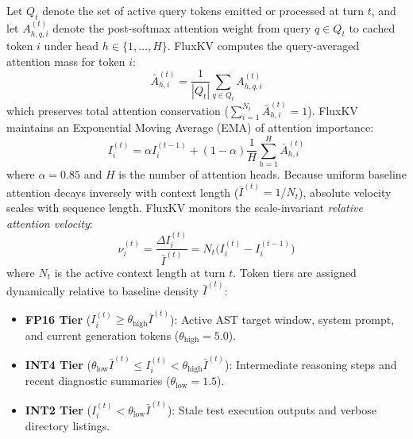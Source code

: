 \documentclass[10pt,twocolumn]{article}
\begin{document}
Let $Q_t$ denote the set of active query tokens emitted or processed at turn $t$, and let $A_{h,q,i}^{(t)}$ denote the post-softmax attention weight from query $q \in Q_t$ to cached token $i$ under head $h \in \{1, \dots, H\}$. FluxKV computes the query-averaged attention mass for token $i$:
\begin{equation}
    \bar{A}_{h,i}^{(t)} = \frac{1}{|Q_t|} \sum_{q \in Q_t} A_{h,q,i}^{(t)}
\end{equation}
which preserves total attention conservation ($\sum_{i=1}^{N_t} \bar{A}_{h,i}^{(t)} = 1$). FluxKV maintains an Exponential Moving Average (EMA) of attention importance:
\begin{equation}
    I_i^{(t)} = \alpha I_i^{(t-1)} + (1 - \alpha) \frac{1}{H} \sum_{h=1}^H \bar{A}_{h,i}^{(t)}
\end{equation}
where $\alpha = 0.85$ and $H$ is the number of attention heads. Because uniform baseline attention decays inversely with context length ($\bar{I}^{(t)} = 1/N_t$), absolute velocity scales with sequence length. FluxKV monitors the scale-invariant \textit{relative attention velocity}:
\begin{equation}
    \nu_i^{(t)} = \frac{\Delta I_i^{(t)}}{\bar{I}^{(t)}} = N_t \big( I_i^{(t)} - I_i^{(t-1)} \big)
\end{equation}
where $N_t$ is the active context length at turn $t$. Token tiers are assigned dynamically relative to baseline density $\bar{I}^{(t)}$:
\begin{itemize}
    \item \textbf{FP16 Tier} ($I_i^{(t)} \ge \theta_{\text{high}} \bar{I}^{(t)}$): Active AST target window, system prompt, and current generation tokens ($\theta_{\text{high}} = 5.0$).
    \item \textbf{INT4 Tier} ($\theta_{\text{low}} \bar{I}^{(t)} \le I_i^{(t)} < \theta_{\text{high}} \bar{I}^{(t)}$): Intermediate reasoning steps and recent diagnostic summaries ($\theta_{\text{low}} = 1.5$).
    \item \textbf{INT2 Tier} ($I_i^{(t)} < \theta_{\text{low}} \bar{I}^{(t)}$): Stale test execution outputs and verbose directory listings.
\end{itemize}
\end{document}
